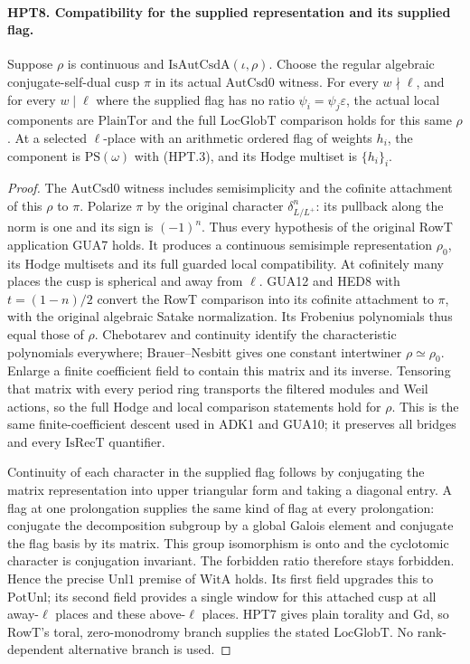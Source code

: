 \documentclass[11pt,a4paper]{article}
\numberwithin{equation}{section}
\theoremstyle{remark}\newtheorem{remark}[theorem]{Remark}
\begin{document}
\paragraph{HPT8. Compatibility for the supplied representation and its supplied flag.}
\label{claim:HPT8}
Suppose $\rho$ is continuous and $\mathrm{IsAutCsdA}(\iota,\rho)$.
Choose the regular algebraic conjugate-self-dual cusp $\pi$ in its
actual $\mathrm{AutCsd0}$ witness.  For every $w\nmid\ell$, and
for every $w\mid\ell$ where the supplied flag has no ratio
$\psi_i=\psi_j\varepsilon$, the actual local components are
$\mathrm{PlainTor}$ and the full $\mathrm{LocGlobT}$ comparison
holds for this same $\rho$.  At a selected $\ell$-place with an
arithmetic ordered flag of weights $h_i$, the component is
$\mathrm{PS}(\omega)$ with (HPT.3), and its Hodge multiset is
$\{h_i\}_i$.
\begin{proof}
The $\mathrm{AutCsd0}$ witness includes semisimplicity and the
cofinite attachment of this $\rho$ to $\pi$.  Polarize $\pi$ by
the original character $\delta_{L/L^+}^{n}$: its pullback along
the norm is one and its sign is $(-1)^n$.  Thus every hypothesis
of the original RowT application GUA7 holds.  It produces a
continuous semisimple representation $\rho_0$, its Hodge
multisets and its full guarded local compatibility.
At cofinitely many places the cusp is spherical and away from
$\ell$.  GUA12 and HED8 with $t=(1-n)/2$ convert the RowT
comparison into its cofinite attachment to $\pi$, with the
original algebraic Satake normalization.  Its Frobenius
polynomials thus equal those of $\rho$.  Chebotarev
and continuity identify the characteristic polynomials everywhere;
Brauer--Nesbitt gives one constant intertwiner
$\rho\simeq\rho_0$.  Enlarge a finite coefficient field to contain
this matrix and its inverse.  Tensoring that matrix with every
period ring transports the filtered modules and Weil actions,
so the full Hodge and local comparison statements hold for $\rho$.
This is the same finite-coefficient descent used in ADK1 and GUA10;
it preserves all bridges and every $\mathrm{IsRecT}$ quantifier.

Continuity of each character in the supplied flag follows by
conjugating the matrix representation into upper triangular form
and taking a diagonal entry.  A flag at one prolongation supplies
the same kind of flag at every prolongation: conjugate the
decomposition subgroup by a global Galois element and conjugate
the flag basis by its matrix.  This group isomorphism is onto and
the cyclotomic character is conjugation invariant.  The forbidden
ratio therefore stays forbidden.  Hence the precise $\mathrm{Unl1}$
premise of $\mathrm{WitA}$ holds.  Its first field upgrades this
to $\mathrm{PotUnl}$; its second field provides a single window
for this attached cusp at all away-$\ell$ places and these
above-$\ell$ places.  HPT7 gives plain torality and $\mathrm{Gd}$,
so RowT's toral, zero-monodromy branch supplies the stated
$\mathrm{LocGlobT}$.  No rank-dependent alternative branch is used.


\end{proof}
\end{document}
